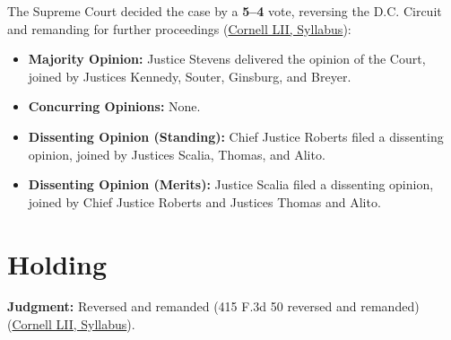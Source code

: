 \documentclass[12pt]{article}
\begin{document}
The Supreme Court decided the case by a \textbf{5--4} vote, reversing the D.C. Circuit and remanding for further proceedings (\href{https://www.law.cornell.edu/supct/html/05-1120.ZS.html}{Cornell LII, Syllabus}):
\begin{itemize}
    \item \textbf{Majority Opinion:} Justice Stevens delivered the opinion of the Court, joined by Justices Kennedy, Souter, Ginsburg, and Breyer.
    \item \textbf{Concurring Opinions:} None.
    \item \textbf{Dissenting Opinion (Standing):} Chief Justice Roberts filed a dissenting opinion, joined by Justices Scalia, Thomas, and Alito.
    \item \textbf{Dissenting Opinion (Merits):} Justice Scalia filed a dissenting opinion, joined by Chief Justice Roberts and Justices Thomas and Alito.
\end{itemize}

\section{Holding}

\textbf{Judgment:} Reversed and remanded (415 F.3d 50 reversed and remanded) (\href{https://www.law.cornell.edu/supct/html/05-1120.ZS.html}{Cornell LII, Syllabus}).
\end{document}
